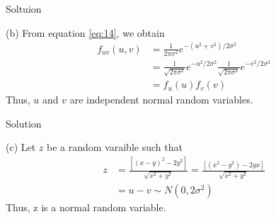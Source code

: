 \documentclass{beamer}
\begin{document}
\begin{frame}{Soltuion}
    \begin{block}{}
        (b) From equation \eqref{eq:14}, we obtain
        \begin{align}
            f_{uv}(u,v) &= \frac{1}{2\pi\sigma^2}e^{-(u^2+v^2)/2\sigma^2}\\
            &=\frac{1}{\sqrt{2\pi\sigma^2}}e^{-u^2/2\sigma^2}\frac{1}{\sqrt{2\pi\sigma^2}}e^{-v^2/2\sigma^2}\\
            &=f_u(u)f_v(v)
        \end{align}
        Thus, $u$ and $v$ are independent normal random variables.
    \end{block}
\end{frame}
\begin{frame}{Solution}
    \begin{block}{}
        (c) Let $z$ be a random varaible such that
        \begin{align}
            z&=\frac{[({x}-{y})^2-2{y}^2]}{\sqrt{{x}^2+{y}^2}}= \frac{[({x}^2-{y}^2)-2{y}{x}]}{\sqrt{{x}^2+{y}^2}} \\
            &= u-v \sim N(0,2\sigma^2)
        \end{align}
        Thus, z is a normal random variable.
    \end{block}
\end{frame}
\end{document}
